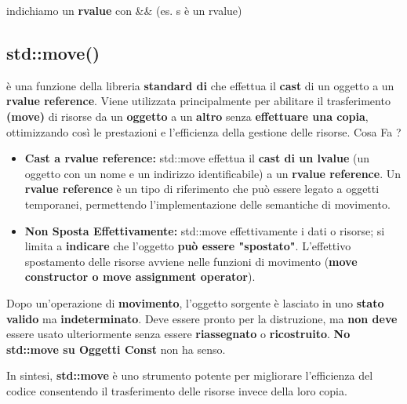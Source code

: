  indichiamo un \textbf{rvalue} con \&\& (es.  s è un rvalue)

 \begin{tcolorbox}[width=14cm, boxsep=10pt]
    
\end{tcolorbox}
\newpage
\subsection{std::move()}
\textcolor{blue}{} è una funzione della libreria \textbf{standard di } che effettua il \textbf{cast} di un oggetto a un \textbf{rvalue reference}. Viene utilizzata principalmente per abilitare il trasferimento \textbf{(move)} di risorse da un \textbf{oggetto} a un \textbf{altro} senza \textbf{effettuare una copia}, ottimizzando così le prestazioni e l'efficienza della gestione delle risorse.\newline\newline
Cosa Fa \textcolor{blue}{}?
\begin{itemize}
    \item \textbf{Cast a rvalue reference:} std::move effettua il \textbf{cast di un lvalue} (un oggetto con un nome e un indirizzo identificabile) a un\textbf{ rvalue reference}. Un \textbf{rvalue reference} è un tipo di riferimento che può essere legato a oggetti temporanei, permettendo l'implementazione delle semantiche di movimento.
    \item \textbf{Non Sposta Effettivamente:} std::move \textcolor{blue}{} effettivamente i dati o risorse; si limita a \textbf{indicare} che l'oggetto \textbf{può essere "spostato"}. L'effettivo spostamento delle risorse avviene nelle funzioni di movimento (\textbf{move constructor o move assignment operator}).\newline
\end{itemize}
 \begin{tcolorbox}[width=14cm, boxsep=10pt]
    \textcolor{blue}{} Dopo un'operazione di \textbf{movimento}, l'oggetto sorgente è lasciato in uno \textbf{stato valido} ma \textbf{indeterminato}. Deve essere pronto per la distruzione, ma \textbf{non deve} essere usato ulteriormente senza essere \textbf{riassegnato} o \textbf{ricostruito}.\newline
    \textbf{No std::move su Oggetti Const} non ha senso.
\end{tcolorbox}
In sintesi, \textbf{std::move} è uno strumento potente per migliorare l'efficienza del codice  consentendo il trasferimento delle risorse invece della loro copia.
\newpage

